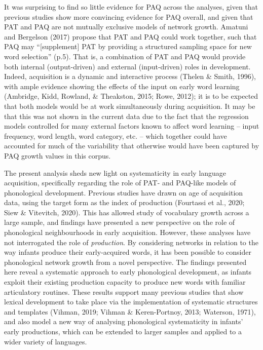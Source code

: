 \documentclass[
  man,mask,floatsintext]{apa6}
\begin{document}
It was surprising to find so little evidence for PAQ across the analyses, given that previous studies show more convincing evidence for PAQ overall, and given that PAT and PAQ are not mutually exclusive models of network growth. Amatuni and Bergelson (2017) propose that PAT and PAQ could work together, such that PAQ may ``{[}supplement{]} PAT by providing a structured sampling space for new word selection'' (p.5). That is, a combination of PAT and PAQ would provide both internal (output-driven) and external (input-driven) roles in development. Indeed, acquisition is a dynamic and interactive process (Thelen \& Smith, 1996), with ample evidence showing the effects of the input on early word learning (Ambridge, Kidd, Rowland, \& Theakston, 2015; Rowe, 2012); it is to be expected that both models would be at work simultaneously during acquisition. It may be that this was not shown in the current data due to the fact that the regression models controlled for many external factors known to affect word learning -- input frequency, word length, word category, etc. -- which together could have accounted for much of the variability that otherwise would have been captured by PAQ growth values in this corpus.

The present analysis sheds new light on systematicity in early language acquisition, specifically regarding the role of PAT- and PAQ-like models of phonological development. Previous studies have drawn on age of acquisition data, using the target form as the index of production (Fourtassi et al., 2020; Siew \& Vitevitch, 2020). This has allowed study of vocabulary growth across a large sample, and findings have presented a new perspective on the role of phonological neighbourhoods in early acquisition. However, these analyses have not interrogated the role of \emph{production}. By considering networks in relation to the way infants produce their early-acquired words, it has been possible to consider phonological network growth from a novel perspective. The findings presented here reveal a systematic approach to early phonological development, as infants exploit their existing production capacity to produce new words with familiar articulatory routines. These results support many previous studies that show lexical development to take place via the implementation of systematic structures and templates (Vihman, 2019; Vihman \& Keren-Portnoy, 2013; Waterson, 1971), and also model a new way of analysing phonological systematicity in infants' early productions, which can be extended to larger samples and applied to a wider variety of languages.
\end{document}
